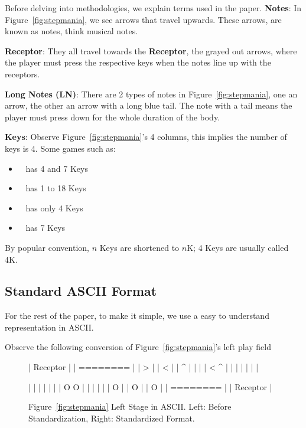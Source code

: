 Before delving into methodologies, we explain terms used in the paper.
\textbf{Notes}: In Figure~\ref{fig:stepmania}, we see arrows that travel upwards.
These arrows, are known as notes, think musical notes.

\textbf{Receptor}: They all travel towards the \textbf{Receptor}, the grayed out arrows, where the player must press the respective keys when the notes line up with the receptors.

\textbf{Long Notes (LN)}: There are 2 types of notes in Figure~\ref{fig:stepmania}, one an arrow, the other an arrow with a long blue tail.
The note with a tail means the player must press down for the whole duration of the body.

\textbf{Keys}: Observe Figure~\ref{fig:stepmania}'s 4 columns, this implies the number of keys is 4.
Some games such as:
\begin{itemize}
    \item~\cite{quaver} has 4 and 7 Keys
    \item~\cite{osu} has 1 to 18 Keys
    \item~\cite{etterna} has only 4 Keys
    \item~\cite{o2jam} has 7 Keys
\end{itemize}

By popular convention, $n$ Keys are shortened to $n$K; 4 Keys are usually called 4K.

\subsection{Standard ASCII Format}\label{subsec:standard-ascii-format}

For the rest of the paper, to make it simple, we use a easy to understand representation in ASCII.

Observe the following conversion of Figure~\ref{fig:stepmania}'s left play field

\begin{figure}[H]
    \centering
    \begin{minipage}{.5\textwidth}
        \centering
        \begin{centeredverbatim}
            | Receptor |
            | ======== |
            |       >  |
            | <        |
            |     ^    |
            |          |
            | <   ^    |
            | |        |
            | |        |
        \end{centeredverbatim}
    \end{minipage}%
    \begin{minipage}{0.5\textwidth}
        \centering
        \begin{centeredverbatim}
            | |        |
            | |        |
            | O O      |
            |          |
            |          |
            |     O    |
            | O        |
            |       O  |
            | ======== |
            | Receptor |
        \end{centeredverbatim}
    \end{minipage}
    \caption{Figure~\ref{fig:stepmania} Left Stage in ASCII. Left: Before Standardization, Right: Standardized Format.}
    \label{fig:fig3ascii}
\end{figure}

